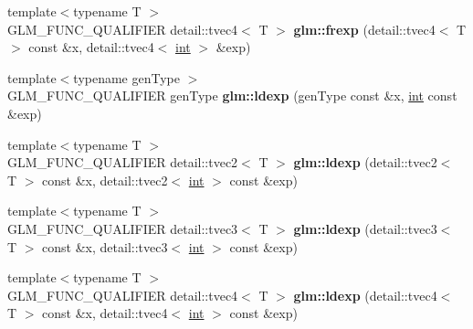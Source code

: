 \begin{DoxyCompactItemize}
\item 
\hypertarget{namespaceglm_a3d5c41a07e38340ad4a30b46c707120c}{}{\footnotesize template$<$typename T $>$ }\\G\+L\+M\+\_\+\+F\+U\+N\+C\+\_\+\+Q\+U\+A\+L\+I\+F\+I\+E\+R detail\+::tvec4$<$ T $>$ {\bfseries glm\+::frexp} (detail\+::tvec4$<$ T $>$ const \&x, detail\+::tvec4$<$ \hyperlink{_s_d_l__thread_8h_a6a64f9be4433e4de6e2f2f548cf3c08e}{int} $>$ \&exp)\label{namespaceglm_a3d5c41a07e38340ad4a30b46c707120c}

\item 
\hypertarget{namespaceglm_a2632eefd82cbdf3ca860c41579a5ef9e}{}{\footnotesize template$<$typename gen\+Type $>$ }\\G\+L\+M\+\_\+\+F\+U\+N\+C\+\_\+\+Q\+U\+A\+L\+I\+F\+I\+E\+R gen\+Type {\bfseries glm\+::ldexp} (gen\+Type const \&x, \hyperlink{_s_d_l__thread_8h_a6a64f9be4433e4de6e2f2f548cf3c08e}{int} const \&exp)\label{namespaceglm_a2632eefd82cbdf3ca860c41579a5ef9e}

\item 
\hypertarget{namespaceglm_af3705e92f7dbca7dee3a2412d4033833}{}{\footnotesize template$<$typename T $>$ }\\G\+L\+M\+\_\+\+F\+U\+N\+C\+\_\+\+Q\+U\+A\+L\+I\+F\+I\+E\+R detail\+::tvec2$<$ T $>$ {\bfseries glm\+::ldexp} (detail\+::tvec2$<$ T $>$ const \&x, detail\+::tvec2$<$ \hyperlink{_s_d_l__thread_8h_a6a64f9be4433e4de6e2f2f548cf3c08e}{int} $>$ const \&exp)\label{namespaceglm_af3705e92f7dbca7dee3a2412d4033833}

\item 
\hypertarget{namespaceglm_a5de427047c366728ca1257c06fa38e2d}{}{\footnotesize template$<$typename T $>$ }\\G\+L\+M\+\_\+\+F\+U\+N\+C\+\_\+\+Q\+U\+A\+L\+I\+F\+I\+E\+R detail\+::tvec3$<$ T $>$ {\bfseries glm\+::ldexp} (detail\+::tvec3$<$ T $>$ const \&x, detail\+::tvec3$<$ \hyperlink{_s_d_l__thread_8h_a6a64f9be4433e4de6e2f2f548cf3c08e}{int} $>$ const \&exp)\label{namespaceglm_a5de427047c366728ca1257c06fa38e2d}

\item 
\hypertarget{namespaceglm_aed70eedaf2ffabe7cb6a36d16f83181d}{}{\footnotesize template$<$typename T $>$ }\\G\+L\+M\+\_\+\+F\+U\+N\+C\+\_\+\+Q\+U\+A\+L\+I\+F\+I\+E\+R detail\+::tvec4$<$ T $>$ {\bfseries glm\+::ldexp} (detail\+::tvec4$<$ T $>$ const \&x, detail\+::tvec4$<$ \hyperlink{_s_d_l__thread_8h_a6a64f9be4433e4de6e2f2f548cf3c08e}{int} $>$ const \&exp)\label{namespaceglm_aed70eedaf2ffabe7cb6a36d16f83181d}

\end{DoxyCompactItemize}


